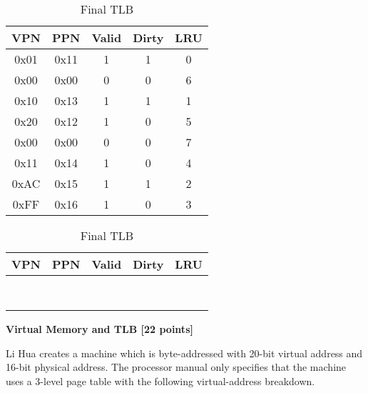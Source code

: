 \documentclass[addpoints, 12pt, answers]{exam}
\begin{document}
\begin{questions}
\begin{table}[H]
	\begin{minipage}[t]{0.5\linewidth}
		\centering
			\caption{Initial TLB}
			\label{tab:ini-tlb}
			\begin{tabular}{|c|c|c|c|c|}
			\hline
			VPN  & PPN  & Valid & Dirty & LRU \\ \hline
			0x01 & 0x11 & 1     & 1     & 0   \\ \hline
			0x00 & 0x00 & 0     & 0     & 6   \\ \hline
			0x10 & 0x13 & 1     & 1     & 1   \\ \hline
			0x20 & 0x12 & 1     & 0     & 5   \\ \hline
			0x00 & 0x00 & 0     & 0     & 7   \\ \hline
			0x11 & 0x14 & 1     & 0     & 4   \\ \hline
			0xAC & 0x15 & 1     & 1     & 2   \\ \hline
			0xFF & 0x16 & 1     & 0     & 3   \\ \hline
			\end{tabular}
	\end{minipage}
	\begin{minipage}[t]{0.5\linewidth}
		\centering
		\caption{Final TLB}
		\label{tab:fin-tlb}
		\begin{tabular}{|c|c|c|c|c|}
		\hline
		VPN  & PPN  & Valid & Dirty & LRU \\ \hline
		 &  &      &      &    \\ \hline
		 &  &      &      &    \\ \hline
		 &  &      &      &    \\ \hline
		 &  &      &      &    \\ \hline
		 &  &      &      &    \\ \hline
		 &  &      &      &    \\ \hline
		 &  &      &      &    \\ \hline
		 &  &      &      &    \\ \hline
		\end{tabular}
	\end{minipage}
\end{table}




\pagebreak

\question[22] \textbf{Virtual Memory and TLB [22 points]}


Li Hua creates a machine which is byte-addressed with 20-bit virtual address and 16-bit physical address. The processor manual only specifies that the machine uses a 3-level page table with the following virtual-address breakdown.



\end{questions}
\end{document}
